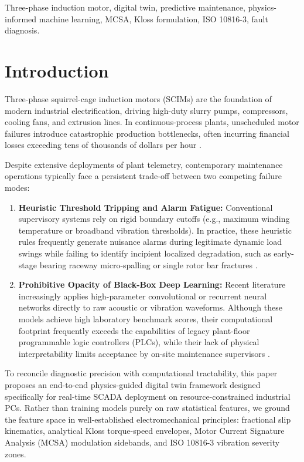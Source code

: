 \documentclass[conference]{IEEEtran}
\begin{document}
\begin{IEEEkeywords}
Three-phase induction motor, digital twin, predictive maintenance, physics-informed machine learning, MCSA, Kloss formulation, ISO 10816-3, fault diagnosis.
\end{IEEEkeywords}

\section{Introduction}
Three-phase squirrel-cage induction motors (SCIMs) are the foundation of modern industrial electrification, driving high-duty slurry pumps, compressors, cooling fans, and extrusion lines. In continuous-process plants, unscheduled motor failures introduce catastrophic production bottlenecks, often incurring financial losses exceeding tens of thousands of dollars per hour \cite{ref1,ref3}.

Despite extensive deployments of plant telemetry, contemporary maintenance operations typically face a persistent trade-off between two competing failure modes:
\begin{enumerate}
    \item \textbf{Heuristic Threshold Tripping and Alarm Fatigue:} Conventional supervisory systems rely on rigid boundary cutoffs (e.g., maximum winding temperature or broadband vibration thresholds). In practice, these heuristic rules frequently generate nuisance alarms during legitimate dynamic load swings while failing to identify incipient localized degradation, such as early-stage bearing raceway micro-spalling or single rotor bar fractures \cite{ref4}.
    \item \textbf{Prohibitive Opacity of Black-Box Deep Learning:} Recent literature increasingly applies high-parameter convolutional or recurrent neural networks directly to raw acoustic or vibration waveforms. Although these models achieve high laboratory benchmark scores, their computational footprint frequently exceeds the capabilities of legacy plant-floor programmable logic controllers (PLCs), while their lack of physical interpretability limits acceptance by on-site maintenance supervisors \cite{ref5}.
\end{enumerate}

To reconcile diagnostic precision with computational tractability, this paper proposes an end-to-end physics-guided digital twin framework designed specifically for real-time SCADA deployment on resource-constrained industrial PCs. Rather than training models purely on raw statistical features, we ground the feature space in well-established electromechanical principles: fractional slip kinematics, analytical Kloss torque-speed envelopes, Motor Current Signature Analysis (MCSA) modulation sidebands, and ISO 10816-3 vibration severity zones.
\end{document}
